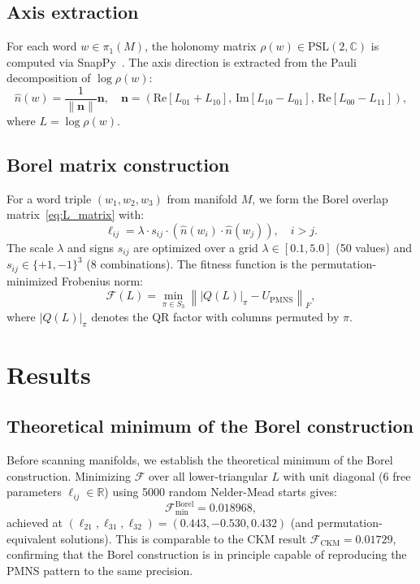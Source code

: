 \documentclass[floatfix,aps,prd,twocolumn,showpacs,superscriptaddress,longbibliography]{revtex4-2}
\newcommand{\PSL}{\mathrm{PSL}(2,\mathbb{C})}
\newcommand{\frob}[1]{\left\|#1\right\|_F}
\begin{document}
\subsection{Axis extraction}

For each word $w \in \pi_1(M)$, the holonomy matrix $\rho(w) \in \PSL$
is computed via SnapPy~\cite{snappy}. The axis direction is extracted
from the Pauli decomposition of $\log \rho(w)$:
\begin{equation}
  \hat{n}(w) = \frac{1}{\|\mathbf{n}\|}\mathbf{n}, \quad
  \mathbf{n} = \left(\mathrm{Re}[L_{01}+L_{10}],\,
                      \mathrm{Im}[L_{10}-L_{01}],\,
                      \mathrm{Re}[L_{00}-L_{11}]\right),
\end{equation}
where $L = \log \rho(w)$.

\subsection{Borel matrix construction}

For a word triple $(w_1, w_2, w_3)$ from manifold $M$, we form the
Borel overlap matrix~\eqref{eq:L_matrix} with:
\begin{equation}
  \ell_{ij} = \lambda \cdot s_{ij} \cdot (\hat{n}(w_i) \cdot \hat{n}(w_j)),
  \quad i > j.
\end{equation}
The scale $\lambda$ and signs $s_{ij}$ are optimized over a grid
$\lambda \in [0.1, 5.0]$ (50 values) and $s_{ij} \in \{+1,-1\}^3$ (8 combinations).
The fitness function is the permutation-minimized Frobenius norm:
\begin{equation}
  \mathcal{F}(L) = \min_{\pi \in S_3} \frob{|Q(L)|_\pi - U_\mathrm{PMNS}},
  \label{eq:fitness_perm}
\end{equation}
where $|Q(L)|_\pi$ denotes the QR factor with columns permuted by $\pi$.

\section{Results}
\label{sec:results}

\subsection{Theoretical minimum of the Borel construction}

Before scanning manifolds, we establish the theoretical minimum of the
Borel construction. Minimizing $\mathcal{F}$ over all lower-triangular
$L$ with unit diagonal (6 free parameters $\ell_{ij} \in \mathbb{R}$)
using 5000 random Nelder-Mead starts gives:
\begin{equation}
  \mathcal{F}_\mathrm{min}^\mathrm{Borel} = 0.018968,
\end{equation}
achieved at $(\ell_{21}, \ell_{31}, \ell_{32}) = (0.443, -0.530, 0.432)$
(and permutation-equivalent solutions).
This is comparable to the CKM result $\mathcal{F}_\mathrm{CKM} = 0.01729$,
confirming that the Borel construction is in principle capable of
reproducing the PMNS pattern to the same precision.
\end{document}
